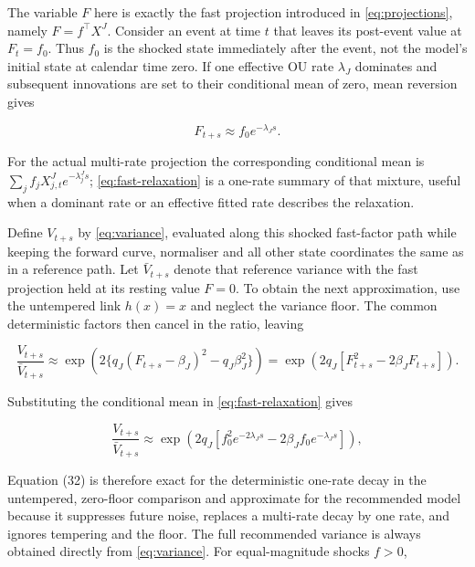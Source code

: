 \documentclass[11pt,a4paper]{article}
\begin{document}
The variable \(F\) here is exactly the fast projection introduced in \cref{eq:projections},
namely \(F=f^\top X^J\).  Consider an event at time \(t\) that leaves its post-event value at
\(F_t=f_0\).  Thus \(f_0\) is the shocked state immediately after the event, not the model's
initial state at calendar time zero.  If one effective OU rate \(\lambda_J\) dominates and
subsequent innovations are set to their conditional mean of zero, mean reversion gives

\begin{equation}
F_{t+s}\approx f_0e^{-\lambda_Js}.
\label{eq:fast-relaxation}
\end{equation}

For the actual multi-rate projection the corresponding conditional mean is
\(\sum_j f_jX_{j,t}^Je^{-\lambda_j^Js}\); \cref{eq:fast-relaxation} is a one-rate summary of
that mixture, useful when a dominant rate or an effective fitted rate describes the relaxation.

Define \(V_{t+s}\) by \cref{eq:variance}, evaluated along this shocked
fast-factor path while keeping the forward curve, normaliser and all other state coordinates
the same as in a reference path.  Let \(\bar V_{t+s}\) denote that reference variance with the
fast projection held at its resting value \(F=0\).  To obtain the next approximation, use the
untempered link \(h(x)=x\) and neglect the variance floor.  The common deterministic factors
then cancel in the ratio, leaving

\begin{equation*}
\frac{V_{t+s}}{\bar V_{t+s}}
\approx\exp\!\left(2\{q_J(F_{t+s}-\beta_J)^2-q_J\beta_J^2\}\right)
=\exp\!\left(2q_J[F_{t+s}^2-2\beta_JF_{t+s}]\right).
\end{equation*}

Substituting the conditional mean in \cref{eq:fast-relaxation} gives

\begin{equation}
\frac{V_{t+s}}{\bar V_{t+s}}
\approx\exp\!\left(
2q_J\left[f_0^2e^{-2\lambda_Js}-2\beta_Jf_0e^{-\lambda_Js}\right]
\right),
\label{eq:spike-path}
\end{equation}

Equation (32) is therefore exact for the deterministic one-rate decay in the untempered,
zero-floor comparison and approximate for the recommended model because it suppresses future
noise, replaces a multi-rate decay by one rate, and ignores tempering and the floor.  The full
recommended variance is always obtained directly from \cref{eq:variance}.  For equal-magnitude
shocks \(f>0\),
\end{document}
